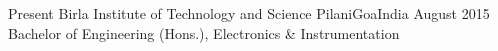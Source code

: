 %
%
%
\begin{educations}
  \education
    {Present}   {Birla Institute of Technology and Science Pilani}{Goa}{India}
    {August 2015} {Bachelor of Engineering (Hons.), Electronics \& Instrumentation
                    }
\end{educations}
\vspace{-3mm}
